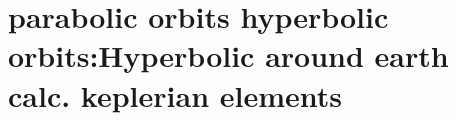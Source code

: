 \section{ parabolic orbits hyperbolic orbits:Hyperbolic around earth calc. keplerian elements  }\label{sec:q2}    
